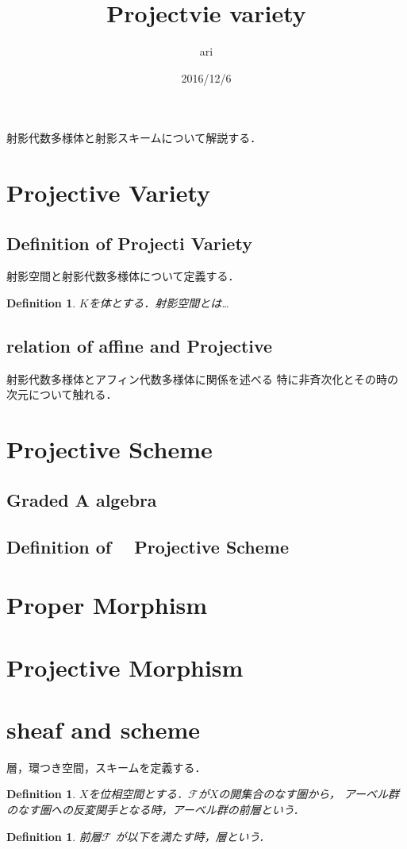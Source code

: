 \documentclass{ujarticle}
\author{ari}
\title{Projectvie variety}
\date{2016/12/6}
\newtheorem{dfn}[thm]{Definition}
\begin{document}
\maketitle
\tableofcontents

射影代数多様体と射影スキームについて解説する．

\section{Projective Variety}
\label{sec:Projective Variety}

\subsection{Definition of Projecti Variety}
\label{sub:Definition of Projecti Variety}

射影空間と射影代数多様体について定義する．
\begin{dfn}
 $K$を体とする．射影空間とは…
\end{dfn}

\subsection{relation of affine and Projective}
\label{sub:relation of affine and Projective}
射影代数多様体とアフィン代数多様体に関係を述べる
特に非斉次化とその時の次元について触れる．

\section{Projective Scheme}
\label{sec:Projective Scheme}


\subsection{Graded A algebra}
\label{sec:Graded A algebra}

\subsection{Definition of　 Projective Scheme}
\label{sub:Definition of Projective Scheme}

\section{Proper Morphism}
\label{sec:Proper Morphism}

\section{Projective Morphism}
\label{sec:Projective Morphism}

\appendix
\section{sheaf and scheme}
層，環つき空間，スキームを定義する．

\begin{dfn}
 $X$を位相空間とする．$\mathcal{F}$が$X$の開集合のなす圏から，
 アーベル群のなす圏への反変関手となる時，アーベル群の前層という．
\end{dfn}
\begin{dfn}
 前層$\mathcal{F}$ が以下を満たす時，層という．



\end{dfn}
\end{document}
